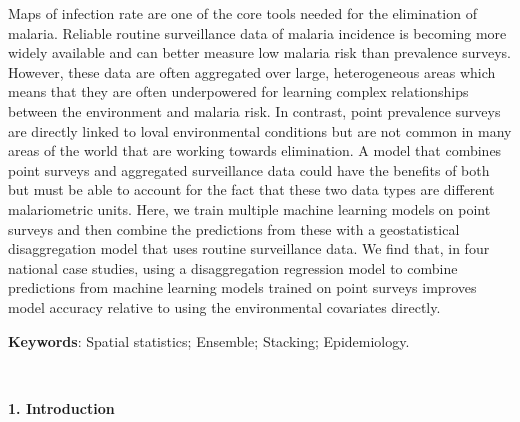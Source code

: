 \documentclass[11pt]{article}
\begin{document}
{Maps of infection rate are one of the core tools needed for the elimination of malaria.
Reliable routine surveillance data of malaria incidence is becoming more widely available and can better measure low malaria risk than prevalence surveys.
However, these data are often aggregated over large, heterogeneous areas which means that they are often underpowered for learning complex relationships between the environment and malaria risk.
In contrast, point prevalence surveys are directly linked to loval environmental conditions but are not common in many areas of the world that are working towards elimination.
A model that combines point surveys and aggregated surveillance data could have the benefits of both but must be able to account for the fact that these two data types are different malariometric units.
Here, we train multiple machine learning models on point surveys and then combine the predictions from these with a geostatistical disaggregation model that uses routine surveillance data.
We find that, in four national case studies, using a disaggregation regression model to combine predictions from machine learning models trained on point surveys improves model accuracy relative to using the environmental covariates directly.                                  

{\bf Keywords}: Spatial statistics; Ensemble; Stacking; Epidemiology.
}\\


\setlength{\parindent}{0pt}

{\bf 1. Introduction}


\end{document}
